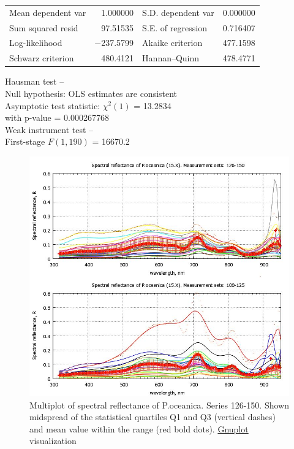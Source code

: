 \documentclass[10pt, a4paper]{article}
\begin{document}
\begin{appendices}
\begin{table}[htbp]
\begin{center}
	\vspace{1ex}
	\begin{tabular}{lrlr}
		Mean dependent var &  1.000000 & S.D. dependent var &  0.000000 \\
		Sum squared resid &  97.51535 & S.E. of regression &  0.716407 \\
		Log-likelihood & $-$237.5799 & Akaike criterion &  477.1598 \\
		Schwarz criterion &  480.4121 & Hannan--Quinn &  478.4771 \\
	\end{tabular}

	\vspace{1em}
	\begin{raggedright}
		Hausman test --\\
		\quad Null hypothesis: OLS estimates are consistent\\
		\quad Asymptotic test statistic: $\chi^2(1)$ = 13.2834\\
		\quad with p-value = 0.000267768\\
	\vspace{1ex}
		Weak instrument test -- \\
		\quad First-stage $F(1, 190)$ = 16670.2 \\
	\end{raggedright}

	\end{center}
	\label{tab:18}
\end{table}

\begin{figure}[H]
	\begin{center}
		\includegraphics[scale=0.4]{GNU-14.jpg}
		\caption{Multiplot of spectral reflectance of P.oceanica. Series 126-150. Shown midspread of the statistical quartiles Q1 and Q3 (vertical dashes) and mean value within the range (red bold dots). \href{http://www.gnuplot.info/}{Gnuplot} visualization­}
		\label{fig:A.27}
	\end{center}
\end{figure}


\end{appendices}
\end{document}
